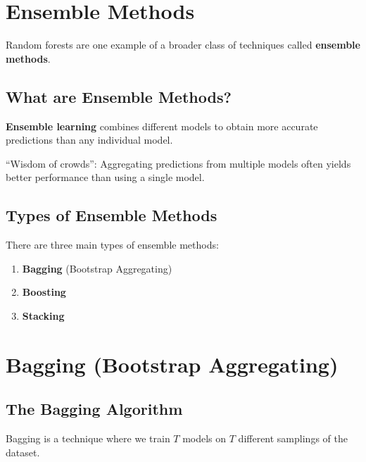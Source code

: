 \documentclass[11pt,a4paper]{article}
\theoremstyle{definition}
\theoremstyle{plain}
\theoremstyle{remark}
\begin{document}
\section{Ensemble Methods}

Random forests are one example of a broader class of techniques called \textbf{ensemble methods}.

\subsection{What are Ensemble Methods?}

\textbf{Ensemble learning} combines different models to obtain more accurate predictions than any individual model.

\begin{tcolorbox}[colback=blue!5!white,colframe=blue!75!black,title=\textbf{Ensemble Learning Principle}]
``Wisdom of crowds'': Aggregating predictions from multiple models often yields better performance than using a single model.
\end{tcolorbox}

\subsection{Types of Ensemble Methods}

There are three main types of ensemble methods:

\begin{enumerate}
    \item \textbf{Bagging} (Bootstrap Aggregating)
    \item \textbf{Boosting}
    \item \textbf{Stacking}
\end{enumerate}

\section{Bagging (Bootstrap Aggregating)}

\subsection{The Bagging Algorithm}

Bagging is a technique where we train \(T\) models on \(T\) different samplings of the dataset.
\end{document}
